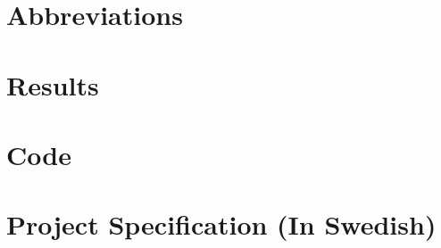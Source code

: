 \documentclass[12pt,twoside]{kau_report}
\begin{document}

\begin{singlespace}


\end{singlespace}
\cleardoublepage

\appendix
\section{Abbreviations}
\label{sec:abbreviations}

\cleardoublepage

\section{Results}
\label{app:results}



\cleardoublepage

%


\section{Code}
\label{app:code}
\cleardoublepage

\section{Project Specification (In Swedish)}
\label{app:projectspec}
\end{document}

